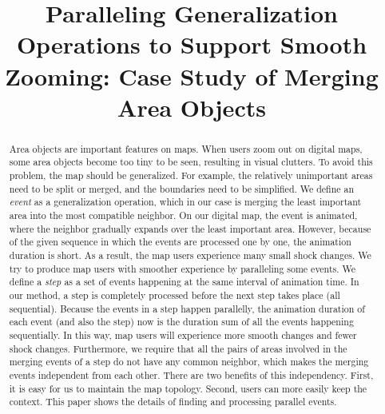 \documentclass[]{interact}
\begin{document}

\title{Paralleling Generalization Operations to Support Smooth Zooming:
Case Study of Merging Area Objects}

\author{
}

\maketitle

\begin{abstract}
Area objects are important features on maps.
When users zoom out on digital maps, 
some area objects become too tiny to be seen, resulting in visual clutters. 
To avoid this problem, the map should be generalized.
For example, the relatively unimportant areas need to be split or merged,
and the boundaries need to be simplified.
We define an \emph{event} as a generalization operation, 
which in our case is merging the least important area 
into the most compatible neighbor.
On our digital map, the event is animated, 
where the neighbor gradually expands over the least important area.
However, because of the given sequence 
in which the events are processed one by one, 
the animation duration is short.
As a result, the map users experience many small shock changes.
We try to produce map users with smoother experience 
by paralleling some events.
We define a \emph{step} as a set of events 
happening at the same interval of animation time.
In our method, a step is completely processed 
before the next step takes place (all sequential).
Because the events in a step happen parallelly,
the animation duration of each event (and also the step) now is 
the duration sum of all the events happening sequentially. 
In this way, map users will experience 
more smooth changes and fewer shock changes. 
Furthermore, we require that 
all the pairs of areas involved in the merging events of a step 
do not have any common neighbor, 
which makes the merging events independent from each other.
There are two benefits of this independency.
First, it is easy for us to maintain the map topology.
Second, users can more easily keep the context.
This paper shows the details of finding and processing parallel events.

\end{abstract}
\end{document}
